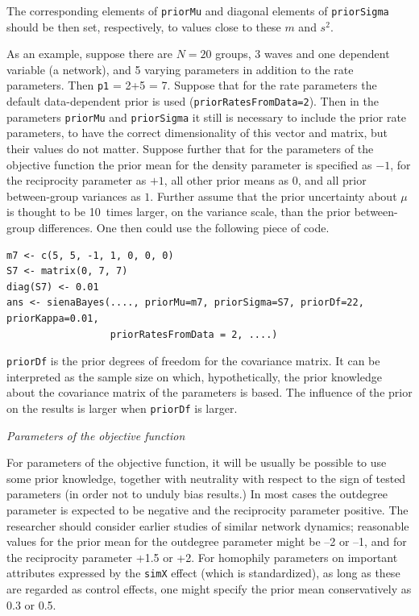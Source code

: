 \documentclass[a4paper,fleqn,11pt]{article}
\newcommand{\+}{\, + \,}
\newcommand{\SI}{{\sf SIENA }}
\begin{document}
The corresponding elements of \texttt{priorMu} and diagonal elements
of \texttt{priorSigma} should be then set, respectively, to values
close to these $m$ and $s^2$.

As an example, suppose there are $N=20$ groups, 3 waves and one dependent
variable (a network), and 5 varying parameters in addition to the rate parameters.
Then \texttt{p1} = 2+5 = 7.
Suppose that for the rate parameters the default
data-dependent prior is used (\texttt{priorRatesFromData=2}).
Then in the parameters \texttt{priorMu} and \texttt{priorSigma}
it still is necessary to include the prior rate parameters,
to have the correct dimensionality of this vector and matrix,
but their values do not matter.
Suppose further that for the parameters of the objective function
the prior mean for the density parameter is specified as $-1$,
for the reciprocity parameter as $+1$,
all other prior means as $0$, and all prior between-group variances as $1$.
Further assume that the prior uncertainty about $\mu$ is thought to be
10~times larger, on the variance scale, than the prior between-group differences.
One then could use the following piece of code.

{\small
\begin{verbatim}
m7 <- c(5, 5, -1, 1, 0, 0, 0)
S7 <- matrix(0, 7, 7)
diag(S7) <- 0.01
ans <- sienaBayes(...., priorMu=m7, priorSigma=S7, priorDf=22, priorKappa=0.01,
                  priorRatesFromData = 2, ....)
\end{verbatim}
}
\noindent
\texttt{priorDf} is the prior degrees of freedom for the
covariance matrix. It can be interpreted as the sample size on which,
hypothetically, the prior knowledge about the covariance matrix of the
parameters is based.
The influence of the prior on the results is larger when \texttt{priorDf}
is larger.
\medskip

\noindent
\emph{Parameters of the objective function}
\smallskip

\noindent
For parameters of the objective function, it will be usually be possible
to use some prior knowledge, together with neutrality with respect to
the sign of tested parameters (in order not to unduly bias results.)
In most cases the outdegree parameter is expected to be negative and
the reciprocity parameter positive. The researcher should consider
earlier studies of similar network dynamics; reasonable values for the
prior mean for the outdegree parameter might be --2 or --1, and for the
reciprocity parameter +1.5 or +2. For homophily parameters on important
attributes expressed by the \texttt{simX} effect (which is standardized),
as long as these are regarded as control effects, one might specify the
prior mean conservatively as 0.3 or 0.5.

\end{document}
